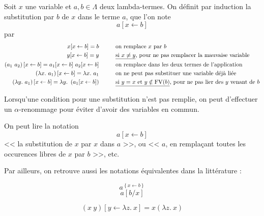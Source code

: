 \documentclass[11pt]{article}
\begin{document}
\begin{definition}
    Soit $x$ une variable et $a, b\in\Lambda$ deux lambda-termes. On définit par induction la substitution par $b$ de $x$ dans le terme $a$, que l'on note
    $$a\left[x\leftarrow b\right]$$
    par
    \begin{equation*}
    \begin{aligned}
        x[x \leftarrow b] = b&\hspace{1cm}\text{on remplace $x$ par $b$}\\
        y[x \leftarrow b] = y &\hspace{1cm}\text{\underline{si $x\ne y$}, pour ne pas remplacer la mauvaise variable}\\
        \left(a_1~a_2\right)[x \leftarrow b] = a_1[x \leftarrow b]~a_2[x \leftarrow b]&\hspace{1cm}\text{on remplace dans les deux termes de l'application}\\
        \left(\lambda x.~a_1\right)[x \leftarrow b] = \lambda x.~a_1&\hspace{1cm}\text{on ne peut pas substituer une variable déjà liée}\\
        \left(\lambda y.~a_1\right)[x \leftarrow b] = \lambda y.~\left(a_1[x \leftarrow b]\right)&\hspace{1cm}\text{\underline{si $y=x$ et $y\notin \operatorname*{FV}(b)$}, pour ne pas lier des $y$ venant de $b$}\\
    \end{aligned}
    \end{equation*}

    Lorsqu'une condition pour une substitution n'est pas remplie, on peut d'effectuer un $\alpha$-renommage pour éviter d'avoir des variables en commun.
\end{definition}

\begin{remark}
    On peut lire la notation $$a\left[x\leftarrow b\right]$$
    << la substitution de $x$ par $x$ dans $a$ >>, ou << $a$, en remplaçant toutes les occurences libres de $x$ par $b$ >>, etc.

    Par ailleurs, on retrouve aussi les notations équivalentes dans la littérature :

    $$a^{\left\{x\leftarrow b\right\}}$$
    $$a\left[b/x\right]$$
\end{remark}

\begin{example}
    $$\left(x~y\right)\left[y \leftarrow \lambda z.~ x\right] = x \left(\lambda z.~ x\right)$$
\end{example}
\end{document}
